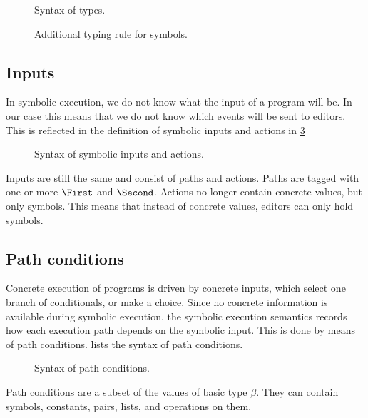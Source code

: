 \begin{figure}[h]
  \small
  \caption{Syntax of \TOPHAT types.}
  \label{fig:syntaxtypes}
\end{figure}

\begin{figure}[h]
  \small
  \caption{Additional typing rule for symbols.}
  \label{fig:typingsymbol}
\end{figure}



\subsection{Inputs}

In symbolic execution, we do not know what the input of a program will be.
In our case this means that we do not know which events will be sent to editors.
This is reflected in the definition of symbolic inputs and actions in \cref{fig:syntaxinputs}

\begin{figure}[h]
  \small
  \caption{Syntax of symbolic inputs and actions.}
  \label{fig:syntaxinputs}
\end{figure}

Inputs are still the same and consist of paths and actions.
Paths are tagged with one or more $\First$ and $\Second$.
Actions no longer contain concrete values, but only symbols.
This means that instead of concrete values, editors can only hold symbols.



\subsection{Path conditions}

Concrete execution of \TOPHAT programs is driven by concrete inputs, which select one branch of conditionals, or make a choice.
Since no concrete information is available during symbolic execution, the symbolic execution semantics records how each execution path depends on the symbolic input.
This is done by means of path conditions.
 lists the syntax of path conditions.

\begin{figure}[h]
  \small
  \caption{Syntax of path conditions.}
  \label{fig:syntaxpredicates}
\end{figure}

Path conditions are a subset of the values of basic type $\beta$.
They can contain symbols, constants, pairs, lists, and operations on them.
